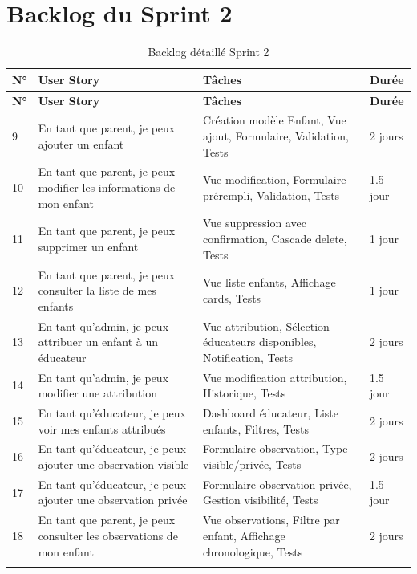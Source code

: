 \documentclass[12pt,a4paper]{report}
\begin{document}
\section{Backlog du Sprint 2}

\begin{longtable}{|p{0.5cm}|p{6cm}|p{6cm}|p{1.5cm}|}
\hline
\textbf{N°} & \textbf{User Story} & \textbf{Tâches} & \textbf{Durée} \\
\hline
\endfirsthead
\hline
\textbf{N°} & \textbf{User Story} & \textbf{Tâches} & \textbf{Durée} \\
\hline
\endhead

9 & En tant que parent, je peux ajouter un enfant & Création modèle Enfant, Vue ajout, Formulaire, Validation, Tests & 2 jours \\
\hline
10 & En tant que parent, je peux modifier les informations de mon enfant & Vue modification, Formulaire prérempli, Validation, Tests & 1.5 jour \\
\hline
11 & En tant que parent, je peux supprimer un enfant & Vue suppression avec confirmation, Cascade delete, Tests & 1 jour \\
\hline
12 & En tant que parent, je peux consulter la liste de mes enfants & Vue liste enfants, Affichage cards, Tests & 1 jour \\
\hline
13 & En tant qu'admin, je peux attribuer un enfant à un éducateur & Vue attribution, Sélection éducateurs disponibles, Notification, Tests & 2 jours \\
\hline
14 & En tant qu'admin, je peux modifier une attribution & Vue modification attribution, Historique, Tests & 1.5 jour \\
\hline
15 & En tant qu'éducateur, je peux voir mes enfants attribués & Dashboard éducateur, Liste enfants, Filtres, Tests & 2 jours \\
\hline
16 & En tant qu'éducateur, je peux ajouter une observation visible & Formulaire observation, Type visible/privée, Tests & 2 jours \\
\hline
17 & En tant qu'éducateur, je peux ajouter une observation privée & Formulaire observation privée, Gestion visibilité, Tests & 1.5 jour \\
\hline
18 & En tant que parent, je peux consulter les observations de mon enfant & Vue observations, Filtre par enfant, Affichage chronologique, Tests & 2 jours \\
\hline

\caption{Backlog détaillé Sprint 2}
\end{longtable}
\end{document}
